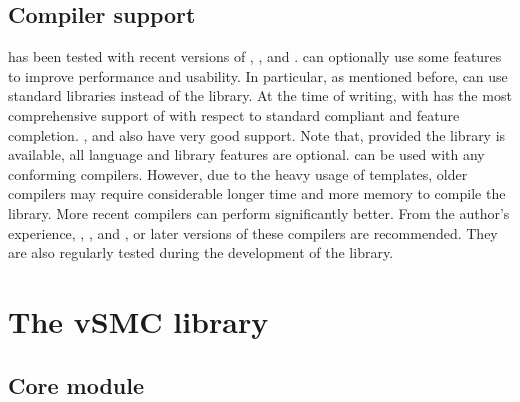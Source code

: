 \documentclass[11pt, fontset=Minion, showoverfull,
bib, mintcode, minted=cache]{marticle}
\begin{document}
\subsection{Compiler support}

\vsmc has been tested with recent versions of \clang, \cgcc, \cicpc and
\cmsvc. \vsmc can optionally use some \cppoo features to improve performance
and usability. In particular, as mentioned before, \vsmc can use \cppoo
standard libraries instead of the \boost library. At the time of writing,
\clang with \libcpp has the most comprehensive support of \cppoo with respect
to standard compliant and feature completion.  ,  and  also have very good \cppoo support. Note that, provided the \boost
library is available, all \cppoo language and library features are optional.
\vsmc can be used with any \cppne conforming compilers. However, due to the
heavy usage of templates, older compilers may require considerable longer time
and more memory to compile the library. More recent compilers can perform
significantly better. From the author's experience, , ,
 and , or later versions of these compilers are
recommended. They are also regularly tested during the development of the
library.

\section{The vSMC library}
\label{sec:The vSMC library}

\subsection{Core module}
\label{sub:Core module}
\end{document}
